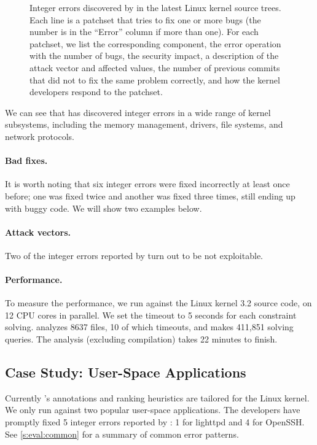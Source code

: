 \begin{figure*}
\centering
\footnotesize

\caption{Integer errors discovered by \sys in the latest Linux
kernel source trees.  Each line is a patchset that tries to fix one
or more bugs (the number is in the ``Error'' column if more than
one).  For each patchset, we list the corresponding component, the
error operation with the number of bugs, the security impact, a
description of the attack vector and affected values, the number
of previous commits that did not to fix the same problem correctly,
and how the kernel developers respond to the patchset.}
\label{f:data:linux}
\end{figure*}

We can see that \sys has discovered integer errors in a wide range
of kernel subsystems, including the memory management, drivers,
file systems, and network protocols.


\paragraph{Bad fixes.}
It is worth noting that six integer errors were fixed incorrectly
at least once before; one was fixed twice and another was fixed
three times, still ending up with buggy code.  We will show two
examples below.

\paragraph{Attack vectors.}

Two of the integer errors reported by \sys turn out to be not
exploitable.

\paragraph{Performance.}
To measure the performance, we run \sys against the Linux kernel
3.2 source code, on 12 CPU cores in parallel.  We set the timeout
to 5 seconds for each constraint solving.   \sys analyzes 8637 files,
10 of which timeouts, and makes 411,851 solving queries.  The
analysis (excluding compilation) takes 22 minutes to finish.

\subsection{Case Study: User-Space Applications}

Currently \sys's annotations and ranking heuristics are tailored
for the Linux kernel.  We only run \sys against two popular user-space
applications.  The developers have promptly fixed 5 integer errors
reported by \sys: 1 for lighttpd and 4 for OpenSSH.  See
\autoref{s:eval:common} for a summary of common error patterns.

